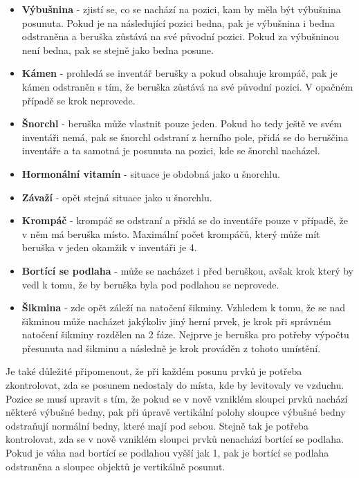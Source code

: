 \begin{itemize}
\item \textbf{Výbušnina} - zjistí se, co se nachází na pozici, kam by měla být výbušnina posunuta. Pokud je na následující pozici bedna, pak je výbušnina i bedna odstraněna a beruška zůstává na své původní pozici. Pokud za výbušninou není bedna, pak se stejně jako bedna posune.
\item \textbf{Kámen} - prohledá se inventář berušky a pokud obsahuje krompáč, pak je kámen odstraněn s tím, že beruška zůstává na své původní pozici. V opačném případě se krok neprovede.
\item \textbf{Šnorchl} - beruška může vlastnit pouze jeden. Pokud ho tedy ještě ve svém inventáři nemá, pak se šnorchl odstraní z herního pole, přidá se do beruščina inventáře a ta samotná je posunuta na pozici, kde se šnorchl nacházel.
\item \textbf{Hormonální vitamín} - situace je obdobná jako u šnorchlu.
\item \textbf{Závaží} - opět stejná situace jako u šnorchlu.
\item \textbf{Krompáč} - krompáč se odstraní a přidá se do inventáře pouze v případě, že v něm má beruška místo. Maximální počet krompáčů, který může mít beruška v jeden okamžik v inventáři je 4.
\item \textbf{Bortící se podlaha} - může se nacházet i před beruškou, avšak krok který by vedl k tomu, že by beruška byla pod podlahou se neprovede.
\item \textbf{Šikmina} - zde opět záleží na natočení šikminy. Vzhledem k tomu, že se nad šikminou může nacházet jakýkoliv jiný herní prvek, je krok při správném natočení šikminy rozdělen na 2 fáze. Nejprve je beruška pro potřeby výpočtu přesunuta nad šikminu a následně je krok prováděn z tohoto umístění. 
\end{itemize}

Je také důležité připomenout, že při každém posunu prvků je potřeba zkontrolovat, zda se posunem nedostaly do místa, kde by levitovaly ve vzduchu. Pozice se musí upravit s tím, že pokud se v nově vzniklém sloupci prvků nachází některé výbušné bedny, pak při úpravě vertikální polohy sloupce výbušné bedny odstraňují normální bedny, které mají pod sebou. Stejně tak je potřeba kontrolovat, zda se v nově vzniklém sloupci prvků nenachází bortící se podlaha. Pokud je váha nad bortící se podlahou vyšší jak 1, pak je bortící se podlaha odstraněna a sloupec objektů je vertikálně posunut.

